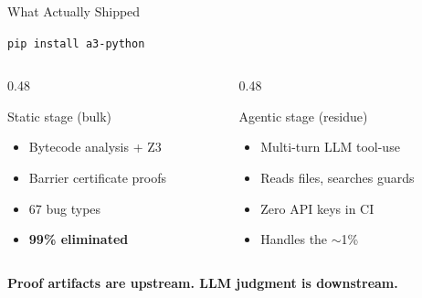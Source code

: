 \documentclass[aspectratio=169]{beamer}
\begin{document}

\begin{frame}{What Actually Shipped}
\begin{center}
\texttt{pip install a3-python}
\end{center}

\vspace{0.5em}
\begin{columns}[T]
\begin{column}{0.48\textwidth}
\begin{block}{Static stage (bulk)}
\begin{itemize}
  \item Bytecode analysis + Z3
  \item Barrier certificate proofs
  \item 67 bug types
  \item \textbf{99\% eliminated}
\end{itemize}
\end{block}
\end{column}
\begin{column}{0.48\textwidth}
\begin{block}{Agentic stage (residue)}
\begin{itemize}
  \item Multi-turn LLM tool-use
  \item Reads files, searches guards
  \item Zero API keys in CI
  \item Handles the $\sim$1\%
\end{itemize}
\end{block}
\end{column}
\end{columns}

\vspace{0.5em}
\centering
\textbf{Proof artifacts are upstream. LLM judgment is downstream.}
\end{frame}
\end{document}
